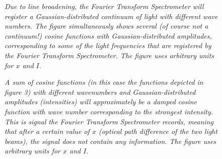\documentclass[a4paper]{article}
\begin{document}
\begin{figure}[htb!]
\label{cos}
\begin{center}
\end{center}
\caption{\textit{Due to line broadening, the Fourier Transform Spectrometer will register a Gaussian-distributed continuum of light with different wave numbers. The figure simultaneously shows several (of course not a continuum!) cosine functions with Gaussian-distributed amplitudes, corresponding to some of the light frequencies that are registered by the Fourier Transform Spectrometer. The figure uses arbitrary units for $x$ and $I$.}}
\end{figure}

\begin{figure}[htb!]
\label{sumCos}
\begin{center}
\end{center}
\caption{\textit{A sum of cosine functions (in this case the functions depicted in figure 3) with different wavenumbers and Gaussian-distributed amplitudes (intensities) will approximately be a damped cosine function with wave number corresponding to the strongest intensity. This is signal the Fourier Transform Spectrometer records, meaning that after a certain value of $x$ (optical path difference of the two light beams), the signal does not contain any information. The figure uses arbitrary units for $x$ and $I$.}}
\end{figure}
\end{document}
